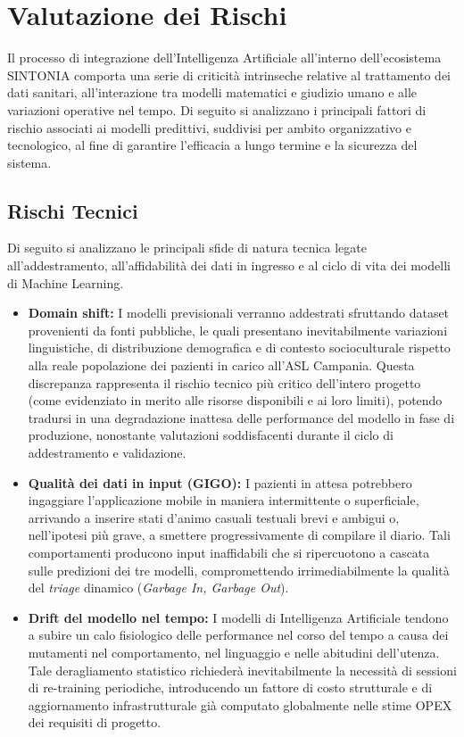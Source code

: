\section{Valutazione dei Rischi}
\label{sec:valutazione_rischi}

Il processo di integrazione dell'Intelligenza Artificiale all'interno dell'ecosistema SINTONIA comporta una serie di criticità intrinseche relative al trattamento dei dati sanitari, all'interazione tra modelli matematici e giudizio umano e alle variazioni operative nel tempo. Di seguito si analizzano i principali fattori di rischio associati ai modelli predittivi, suddivisi per ambito organizzativo e tecnologico, al fine di garantire l'efficacia a lungo termine e la sicurezza del sistema.

\subsection*{Rischi Tecnici}

Di seguito si analizzano le principali sfide di natura tecnica legate all'addestramento, all'affidabilità dei dati in ingresso e al ciclo di vita dei modelli di Machine Learning.

\begin{itemize}
    \item \textbf{Domain shift:} I modelli previsionali verranno addestrati sfruttando dataset provenienti da fonti pubbliche, le quali presentano inevitabilmente variazioni linguistiche, di distribuzione demografica e di contesto socioculturale rispetto alla reale popolazione dei pazienti in carico all'ASL Campania. Questa discrepanza rappresenta il rischio tecnico più critico dell'intero progetto (come evidenziato in merito alle risorse disponibili e ai loro limiti), potendo tradursi in una degradazione inattesa delle performance del modello in fase di produzione, nonostante valutazioni soddisfacenti durante il ciclo di addestramento e validazione.
    \item \textbf{Qualità dei dati in input (GIGO):} I pazienti in attesa potrebbero ingaggiare l'applicazione mobile in maniera intermittente o superficiale, arrivando a inserire stati d'animo casuali testuali brevi e ambigui o, nell'ipotesi più grave, a smettere progressivamente di compilare il diario. Tali comportamenti producono input inaffidabili che si ripercuotono a cascata sulle predizioni dei tre modelli, compromettendo irrimediabilmente la qualità del \textit{triage} dinamico (\textit{Garbage In, Garbage Out}).
    \item \textbf{Drift del modello nel tempo:} I modelli di Intelligenza Artificiale tendono a subire un calo fisiologico delle performance nel corso del tempo a causa dei mutamenti nel comportamento, nel linguaggio e nelle abitudini dell'utenza. Tale deragliamento statistico richiederà inevitabilmente la necessità di sessioni di re-training periodiche, introducendo un fattore di costo strutturale e di aggiornamento infrastrutturale già computato globalmente nelle stime OPEX dei requisiti di progetto.
\end{itemize}

